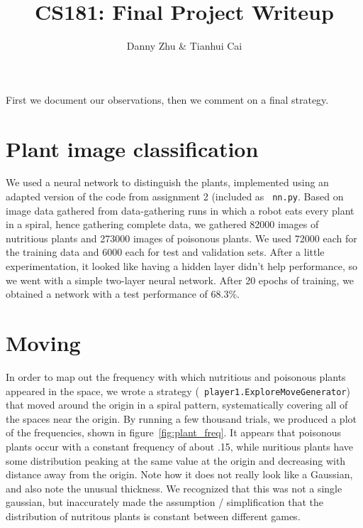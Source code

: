\documentclass{article}
\title{CS181: Final Project Writeup}
\author{Danny Zhu \& Tianhui Cai}
\begin{document}
\maketitle
First we document our observations, then we comment on
a final strategy.

\section{Plant image classification}

We used a neural network to distinguish the plants, implemented using
an adapted version of the code from assignment 2 (included as {\tt
  nn.py}. Based on image data gathered from data-gathering runs in which
a robot eats every plant in a spiral, hence gathering complete data,
we gathered 82000 images of nutritious plants and
273000 images of poisonous plants. We used 72000 each for the training data
and 6000 each for test and validation sets. After a little
experimentation, it looked like having a hidden layer didn't help
performance, so we went with a simple two-layer neural network. After
20 epochs of training, we obtained a network with a test performance
of $68.3\%$.





\section{Moving}
\label{sec:moving}
In order to map out the frequency with which nutritious and poisonous
plants appeared in the space, we wrote a strategy ({\tt
  player1.ExploreMoveGenerator}) that moved around the origin in a
spiral pattern, systematically covering all of the spaces near the
origin. By running a few thousand trials, we produced a plot of the
frequencies, shown in figure~\ref{fig:plant_freq}. It appears that
poisonous plants occur with a constant frequency of about .15, while
nuritious plants have some distribution peaking at the same value at
the origin and decreasing with distance away from the origin. Note how
it does not really look like a Gaussian, and also note the unusual
thickness. We recognized that this was not a single gaussian, but 
inaccurately made the assumption / simplification that the distribution
of nutritous plants is constant between different games. 
\end{document}
